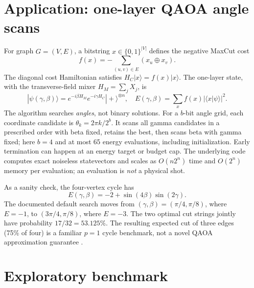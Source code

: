 \documentclass[10pt,a4paper]{article}
\begin{document}
\section{Application: one-layer QAOA angle scans}
For graph $G=(V,E)$, a bitstring $x\in\{0,1\}^{|V|}$ defines the negative MaxCut cost
\begin{equation}
 f(x)=-\sum_{(u,v)\in E}(x_u\oplus x_v).
\end{equation}
The diagonal cost Hamiltonian satisfies $H_C|x\rangle=f(x)|x\rangle$. The one-layer state, with the transverse-field mixer $H_M=\sum_j X_j$, is
\begin{equation}
 |\psi(\gamma,\beta)\rangle=e^{-i\beta H_M}e^{-i\gamma H_C}|+\rangle^{\otimes n},
\quad E(\gamma,\beta)=\sum_x f(x)|\langle x|\psi\rangle|^2.\label{eq:qaoa}
\end{equation}
The algorithm searches \emph{angles}, not binary solutions. For a $b$-bit angle grid, each coordinate candidate is $\theta_k=2\pi k/2^b$. It scans all gamma candidates in a prescribed order with beta fixed, retains the best, then scans beta with gamma fixed; here $b=4$ and at most 65 energy evaluations, including initialization. Early termination can happen at an energy target or budget cap. The underlying code computes exact noiseless statevectors and scales as $O(n2^n)$ time and $O(2^n)$ memory per evaluation; an evaluation is \emph{not} a physical shot.

As a sanity check, the four-vertex cycle has
\begin{equation}
E(\gamma,\beta)=-2+\sin(4\beta)\sin(2\gamma).
\end{equation}
The documented default search moves from $(\gamma,\beta)=(\pi/4,\pi/8)$, where $E=-1$, to $(3\pi/4,\pi/8)$, where $E=-3$. The two optimal cut strings jointly have probability $17/32=53.125\%$. The resulting expected cut of three edges (75\% of four) is a familiar $p=1$ cycle benchmark, not a novel QAOA approximation guarantee \cite{farhi2014}.

\section{Exploratory benchmark}
\end{document}
